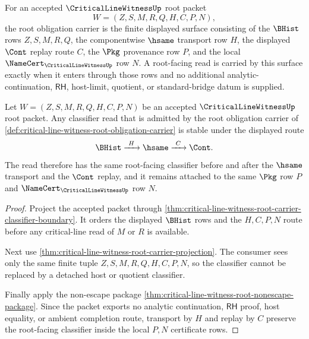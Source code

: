 \begin{definition}
\label{def:critical-line-witness-root-obligation-carrier}
For an accepted $\CriticalLineWitnessUp$ root packet
$$
W=(Z,S,M,R,Q,H,C,P,N),
$$
the root obligation carrier is the finite displayed surface consisting of
the $\BHist$ rows $Z,S,M,R,Q$, the componentwise $\hsame$ transport row
$H$, the displayed $\Cont$ replay route $C$, the $\Pkg$ provenance row $P$,
and the local $\NameCert_{\CriticalLineWitnessUp}$ row $N$. A root-facing
read is carried by this surface exactly when it enters through those rows
and no additional analytic-continuation, $\mathsf{RH}$, host-limit,
quotient, or standard-bridge datum is supplied.
\end{definition}

\begin{theorem}
\label{thm:critical-line-witness-root-classifier-stability}
Let $W=(Z,S,M,R,Q,H,C,P,N)$ be an accepted $\CriticalLineWitnessUp$ root
packet. Any classifier read that is admitted by the root obligation carrier
of \autoref{def:critical-line-witness-root-obligation-carrier} is stable
under the displayed route
$$
\BHist \xrightarrow{\ H\ } \hsame \xrightarrow{\ C\ } \Cont .
$$
The read therefore has the same root-facing classifier before and after the
$\hsame$ transport and the $\Cont$ replay, and it remains attached to the
same $\Pkg$ row $P$ and $\NameCert_{\CriticalLineWitnessUp}$ row $N$.
\end{theorem}
\begin{proof}
Project the accepted packet through
\autoref{thm:critical-line-witness-root-carrier-classifier-boundary}. It
orders the displayed $\BHist$ rows and the $H,C,P,N$ route before any
critical-line read of $M$ or $R$ is available.

Next use \autoref{thm:critical-line-witness-root-carrier-projection}. The
consumer sees only the same finite tuple $Z,S,M,R,Q,H,C,P,N$, so the
classifier cannot be replaced by a detached host or quotient classifier.

Finally apply the non-escape package
\autoref{thm:critical-line-witness-root-nonescape-package}. Since the packet
exports no analytic continuation, $\mathsf{RH}$ proof, host equality, or
ambient completion route, transport by $H$ and replay by $C$ preserve the
root-facing classifier inside the local $P,N$ certificate rows.
\end{proof}

